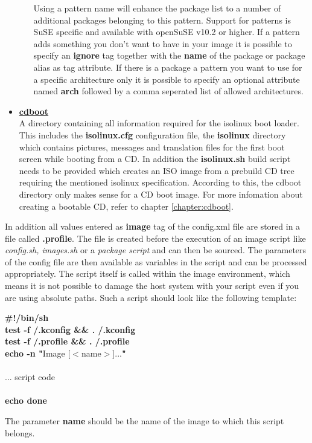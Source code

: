 \begin{itemize}
\begin{enumerate}
\begin{itemize}
                \end{itemize}
				Using a pattern name will enhance the package list to
				a number of additional packages belonging to this pattern.
				Support for patterns is SuSE specific and available with
				openSuSE v10.2 or higher. If a pattern adds something you
                don't want to have in your image it is possible to specify
                an \textbf{ignore} tag together with the \textbf{name} of the
                package or package alias as tag attribute. If there is a
                package a pattern you want to use for a specific architecture
                only it is possible to specify an optional attribute named
                \textbf{arch} followed by a comma seperated list of allowed
                architectures.
      \end{enumerate}
\item \textbf{\underline{cdboot}}\\
A directory containing all information required for the isolinux
boot loader. This includes the \textbf{isolinux.cfg} configuration
file, the \textbf{isolinux} directory which contains pictures, messages and
translation files for the first boot screen while booting from a CD.
In addition the \textbf{isolinux.sh} build script needs to be provided
which creates an ISO image from a prebuild CD tree requiring the mentioned
isolinux specification. According to this, the cdboot directory
only makes sense for a CD boot image. For more infomation about creating
a bootable CD, refer to chapter \ref{chapter:cdboot}.
\end{itemize}

In addition all values entered as \textbf{image} tag of the config.xml
file are stored in a file called \textbf{.profile}. The file is created
before the execution of an image script like \textit{config.sh, images.sh}
or a \textit{package script} and can then be sourced. The parameters
of the config file are then available as variables in the
script and can be processed appropriately. The script itself is called
within the image environment, which means it
is not possible to damage the host system with your script even if you
are using absolute paths. Such a script should look like the following
template:

\begin{Command}{9cm}
\textbf{\#!/bin/sh}\\
\textbf{test -f /.kconfig \&\& . /.kconfig}\\
\textbf{test -f /.profile \&\& . /.profile}\\
\textbf{echo -n "}Image [$<$name$>$]...\textbf{"}\\
\\
... script code\\
\\
\textbf{echo done}
\end{Command}

The parameter \textbf{name} should be the name of the image to which this
script belongs.

